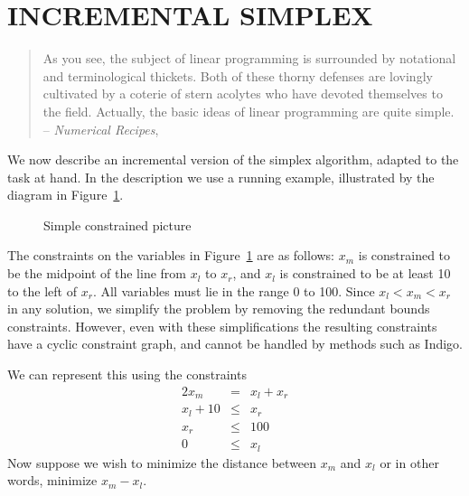 \documentclass{uist96}
\begin{document}
\section{INCREMENTAL SIMPLEX}
\label{inc-simplex}

\begin{quotation}
As you see, the subject of linear programming is surrounded by notational
and terminological thickets.  Both of these thorny defenses are lovingly
cultivated by a coterie of stern acolytes who have devoted themselves to
the field.  
Actually, the basic ideas of linear programming are quite simple. 
-- {\em Numerical Recipes}, \cite[page 424]{press-89}
\end{quotation}

We now describe an incremental version of the simplex algorithm, adapted to
the task at hand.
In the description we use a running example,
illustrated by the diagram in Figure~\ref{fig:pict}.

\begin{figure}[htb]
\begin{center}

\end{center}
\caption{Simple constrained picture\label{fig:pict}}
\end{figure}

The constraints on the variables in Figure~\ref{fig:pict} are as follows:
$x_m$ is constrained to be the midpoint of the line from $x_l$ to $x_r$,
and $x_l$ is constrained to be at least 10 to the left of $x_r$.  All
variables must lie in the range 0 to 100.  
Since $x_l < x_m < x_r$ in any
solution, we simplify the problem by removing the redundant bounds
constraints.  However,
even with these simplifications the resulting constraints have a cyclic
constraint graph, and cannot be handled by methods such as Indigo.

We can represent this using the constraints
$$\begin{array}{rcl}
2 x_m &=& x_l + x_r \\
x_l + 10 &\leq &x_r \\
x_r &\leq& 100 \\
0 &\leq& x_l
\end{array}$$
Now suppose  we wish to minimize the distance between
$x_m$ and $x_l$ or in other words, minimize $x_m - x_l$.
\end{document}
